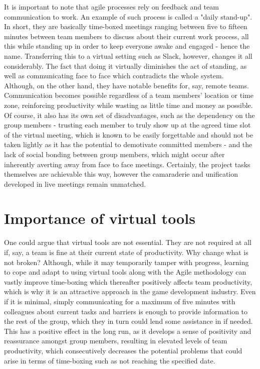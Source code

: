 \documentclass{scrartcl}
\begin{document}
It is important to note that agile processes rely on feedback and team communication to work\cite{Manifesto, Steve}. An example of such process is called a "daily stand-up". In short, they are basically time-boxed meetings ranging between five to fifteen minutes between team members to discuss about their current work process, all this while standing up in order to keep everyone awake and engaged - hence the name. Transferring this to a virtual setting such as Slack, however, changes it all considerably. The fact that doing it virtually diminishes the act of standing, as well as communicating face to face which contradicts the whole system\cite{Lehmann}. Although, on the other hand, they have notable benefits for, say, remote teams. Communication becomes possible regardless of a team members' location or time zone, reinforcing productivity while wasting as little time and money as possible. Of course, it also has its own set of disadvantages, such as the dependency on the group members - trusting each member to truly show up at the agreed time slot of the virtual meeting, which is known to be easily forgettable and should not be taken lightly as it has the potential to demotivate committed members - and the lack of social bonding between group members, which might occur after inherently averting away from face to face meetings. \cite{Lehmann} Certainly, the project tasks themselves are achievable this way, however the camaraderie and unification developed in live meetings remain unmatched.

\section{Importance of virtual tools}
One could argue that virtual tools are not essential. They are not required at all if, say, a team is fine at their current state of productivity. Why change what is not broken? Although, while it may temporarily tamper with progress, learning to cope and adapt to using virtual tools along with the Agile methodology can vastly improve time-boxing which thereafter positively affects team productivity, which is why it is an attractive approach in the game development industry. Even if it is minimal, simply communicating for a maximum of five minutes with colleagues about current tasks and barriers is enough to provide information to the rest of the group, which they in turn could lend some assistance in if needed. This has a positive effect in the long run, as it develops a sense of positivity and reassurance amongst group members, resulting in elevated levels of team productivity, which consecutively decreases the potential problems that could arise in terms of time-boxing such as not reaching the specified date.
\end{document}
